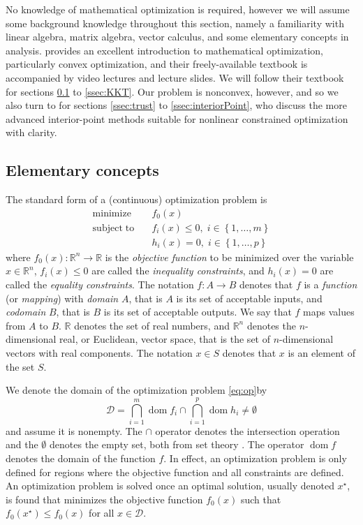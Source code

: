 No knowledge of mathematical optimization is required, however we will assume some background knowledge throughout this section, namely a familiarity with linear algebra, matrix algebra, vector calculus, and some elementary concepts in analysis. \citet{Boyd04} provides an excellent introduction to mathematical optimization, particularly convex optimization, and their freely-available textbook is accompanied by video lectures and lecture slides. We will follow their textbook for sections \ref{ssec:elementaryOptimization} to \ref{ssec:KKT}. Our problem is nonconvex, however, and so we also turn to \citet{Nocedal06} for sections \ref{ssec:trust} to \ref{ssec:interiorPoint}, who discuss the more advanced interior-point methods suitable for nonlinear constrained optimization with clarity.

\subsection{Elementary concepts} \label{ssec:elementaryOptimization}
The standard form of a (continuous) optimization problem is
\begin{align} \label{eq:op}
\mathrm{minimize}   \quad & f_0(x) \nonumber \\
\mathrm{subject\;to} \quad &
f_i(x) \leq 0, \; i \in \left\{1, \dots, m \right\}\\
& h_i(x) = 0, \; i \in \left\{1, \dots, p \right\} \nonumber
\end{align}
where $f_0(x): \mathbb{R}^n \rightarrow \mathbb{R}$ is the \emph{objective function} to be minimized over the variable $x \in \mathbb{R}^n$, $f_i(x) \leq 0$ are called the \emph{inequality constraints}, and $h_i(x) = 0$ are called the \emph{equality constraints}. The notation $f: A \rightarrow B$ denotes that $f$ is a \emph{function} (or \emph{mapping}) with \emph{domain} $A$, that is $A$ is its set of acceptable inputs, and \emph{codomain} $B$, that is $B$ is its set of acceptable outputs. We say that $f$ maps values from $A$ to $B$. $\mathbb{R}$ denotes the set of real numbers, and $\mathbb{R}^n$ denotes the $n$-dimensional real, or Euclidean, vector space, that is the set of $n$-dimensional vectors with real components. The notation $x \in S$ denotes that $x$ is an element of the set $S$.

We denote the domain of the optimization problem \eqref{eq:op}by
\begin{equation}
\mathcal{D} = \bigcap_{i=1}^m \operatorname{dom} f_i \cap \bigcap_{i=1}^p \operatorname{dom} h_i \neq \emptyset
\end{equation}
and assume it is nonempty. The $\cap$ operator denotes the intersection operation and the $\emptyset$ denotes the empty set, both from set theory \citep{Halmos17}. The operator $\operatorname{dom} f$ denotes the domain of the function $f$. In effect, an optimization problem is only defined for regions where the objective function and all constraints are defined. An optimization problem is solved once an optimal solution, usually denoted $x^\star$, is found that minimizes the objective function $f_0(x)$ such that $f_0(x^\star) \le f_0(x)$ for all $x \in \mathcal{D}$.

